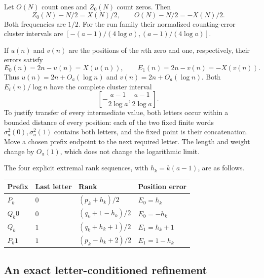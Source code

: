 \documentclass[11pt]{article}
\numberwithin{equation}{section}
\theoremstyle{definition}
\theoremstyle{remark}
\begin{document}
Let $O(N)$ count ones and $Z_0(N)$ count zeros.
Then
\[
 Z_0(N)-N/2=X(N)/2,\qquad O(N)-N/2=-X(N)/2.
\]
Both frequencies are $1/2$. For the run family their normalized
counting-error cluster intervals are
$[-(a-1)/(4\log a),(a-1)/(4\log a)]$.

If $u(n)$ and $v(n)$ are the positions of the $n$th zero and
one, respectively, their errors satisfy
\begin{equation}\label{bmf:eq:position-exact}
 E_0(n)=2n-u(n)=X(u(n)),\qquad
 E_1(n)=2n-v(n)=-X(v(n)).
\end{equation}
Thus $u(n)=2n+O_a(\log n)$ and $v(n)=2n+O_a(\log n)$.
Both $E_i(n)/\log n$ have the complete cluster interval
\begin{equation}\label{bmf:eq:position-cluster}
 \left[-\frac{a-1}{2\log a},\frac{a-1}{2\log a}\right].
\end{equation}
To justify transfer of every intermediate value, both letters
occur within a bounded distance of every position: each of
the two fixed finite words $\sigma_a^2(0),\sigma_a^2(1)$
contains both letters, and the fixed point is their
concatenation. Move a chosen prefix endpoint to the next
required letter. The length and weight change by $O_a(1)$,
which does not change the logarithmic limit.

The four explicit extremal rank sequences, with $h_k=k(a-1)$,
are as follows.
\begin{center}
\begin{tabular}{llll}
\toprule
Prefix & Last letter & Rank & Position error\\
\midrule
$P_k$ & $0$ & $(p_k+h_k)/2$ & $E_0=h_k$\\
$Q_k0$ & $0$ & $(q_k+1-h_k)/2$ & $E_0=-h_k$\\
$Q_k$ & $1$ & $(q_k+h_k+1)/2$ & $E_1=h_k+1$\\
$P_k1$ & $1$ & $(p_k-h_k+2)/2$ & $E_1=1-h_k$\\
\bottomrule
\end{tabular}
\end{center}

\subsection{An exact letter-conditioned refinement}
\end{document}
